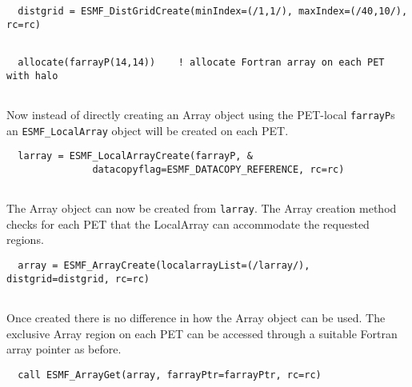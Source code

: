 
 \begin{verbatim}
  distgrid = ESMF_DistGridCreate(minIndex=(/1,1/), maxIndex=(/40,10/), rc=rc)
 
\end{verbatim}
 

 \begin{verbatim}
  allocate(farrayP(14,14))    ! allocate Fortran array on each PET with halo
 
\end{verbatim}
 

   Now instead of directly creating an Array object using the PET-local 
   {\tt farrayP}s an {\tt ESMF\_LocalArray} object will be created on each PET. 

 \begin{verbatim}
  larray = ESMF_LocalArrayCreate(farrayP, &
               datacopyflag=ESMF_DATACOPY_REFERENCE, rc=rc)
 
\end{verbatim}
 

   The Array object can now be created from {\tt larray}. The Array 
   creation method checks for each PET that the LocalArray can 
   accommodate the requested regions. 

 \begin{verbatim}
  array = ESMF_ArrayCreate(localarrayList=(/larray/), distgrid=distgrid, rc=rc)
 
\end{verbatim}
 

   Once created there is no difference in how the Array object can be used.
   The exclusive Array region on each PET can be accessed through a suitable
   Fortran array pointer as before. 

 \begin{verbatim}
  call ESMF_ArrayGet(array, farrayPtr=farrayPtr, rc=rc)
 
\end{verbatim}
 
